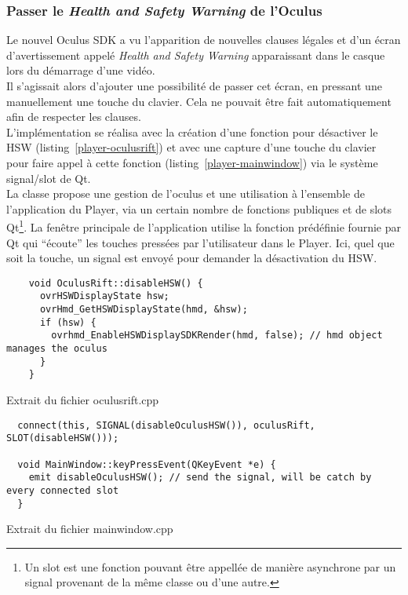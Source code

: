 \subsubsection{Passer le \textit{Health and Safety Warning} de l'Oculus}
Le nouvel Oculus SDK a vu l'apparition de nouvelles clauses légales et d'un écran
d'avertissement appelé \textit{Health and Safety Warning} apparaissant
dans le casque lors du démarrage d'une vidéo\cite{oculus-developer-guide}.\\
Il s'agissait alors d'ajouter une possibilité de passer cet écran, en pressant une
manuellement une touche du clavier. Cela ne pouvait être fait automatiquement afin de respecter les clauses.
\ \\
L'implémentation se réalisa avec la création d'une fonction pour désactiver le HSW
(listing~\ref{player-oculusrift}) et avec une capture d'une touche du clavier pour faire appel à 
cette fonction (listing~\ref{player-mainwindow}) via le système signal/slot de Qt.\\
La classe  propose une gestion de l'oculus et une utilisation
à l'ensemble de l'application du Player, via un certain nombre de fonctions publiques
et de slots Qt\footnote{Un slot est une fonction pouvant être appellée de manière asynchrone 
par un signal provenant de la même classe ou d'une autre.}. La fenêtre principale 
de l'application utilise la fonction prédéfinie  fournie
par Qt qui \enquote{écoute} les touches pressées par l'utilisateur dans le Player.
Ici, quel que soit la touche, un signal est envoyé pour demander la désactivation du HSW.
\begin{listing}
  \begin{verbatim}
    void OculusRift::disableHSW() {
      ovrHSWDisplayState hsw;
      ovrHmd_GetHSWDisplayState(hmd, &hsw);
      if (hsw) {
        ovrhmd_EnableHSWDisplaySDKRender(hmd, false); // hmd object manages the oculus
      }
    }
  \end{verbatim}
  \caption{Extrait du fichier oculusrift.cpp}
  \label{player-oculusrift}
\end{listing}

\begin{listing}
  \begin{verbatim}
  connect(this, SIGNAL(disableOculusHSW()), oculusRift, SLOT(disableHSW()));
  
  void MainWindow::keyPressEvent(QKeyEvent *e) { 
    emit disableOculusHSW(); // send the signal, will be catch by every connected slot
  }
  \end{verbatim}
  \caption{Extrait du fichier mainwindow.cpp}
  \label{player-mainwindow}
\end{listing}


